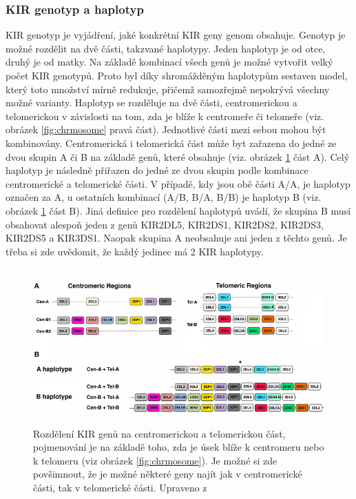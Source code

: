 \documentclass[czech,DP]{thesiskiv}
\numberwithin{equation}{section}
\begin{document}
\subsubsection{KIR genotyp a haplotyp}
KIR genotyp je vyjádření, jaké konkrétní KIR geny genom obsahuje. Genotyp je možné rozdělit na dvě části, takzvané haplotypy. Jeden haplotyp je od otce, druhý je od matky. Na základě kombinací všech genů je možné vytvořit velký počet KIR genotypů. Proto byl díky shromážděným haplotypům sestaven model, který toto množství mírně redukuje, přičemž samozřejmě nepokrývá všechny možné varianty. Haplotyp se rozděluje na dvě části, centromerickou a telomerickou v závislosti na tom, zda je blíže k centromeře či telomeře (viz. obrázek \ref{fig:chrmosome} pravá část). Jednotlivé části mezi sebou mohou být kombinovány. Centromerická i telomerická část může byt zařazena do jedné ze dvou skupin A či B na základě genů, které obsahuje (viz. obrázek \ref{fig:kir_haplotypy_ct} část A). Celý haplotyp je následně přiřazen do jedné ze dvou skupin podle kombinace centromerické a telomerické části. V případě, kdy jsou obě části A/A, je haplotyp označen za A, u ostatních kombinací (A/B, B/A, B/B) je haplotyp B (viz. obrázek \ref{fig:kir_haplotypy_ct} část B). Jiná definice pro rozdělení haplotypů uvádí, že skupina B musí obsahovat alespoň jeden z genů KIR2DL5, KIR2DS1, KIR2DS2, KIR2DS3, KIR2DS5 a KIR3DS1. Naopak skupina A neobsahuje ani jeden z těchto genů. Je třeba si zde uvědomit, že každý jedinec má 2 KIR haplotypy. \cite{KIR_haplotypy_ct}
\\
\\
\begin{figure}[H]		
		\centering
		\includegraphics[width=\textwidth]{./img/KIR_haplotype.jpg}
		\caption{Rozdělení KIR genů na centromerickou a telomerickou část, pojmenování je na základě toho, zda je úsek blíže k centromeru nebo k telomeru (viz obrázek \ref{fig:chrmosome}). Je možné si zde povšimnout, že je možné některé geny najít jak v centromerické části, tak v telomerické části. Upraveno z \cite{KIR_haplotypy_ct}}
		\label{fig:kir_haplotypy_ct}
\end{figure}
\end{document}
